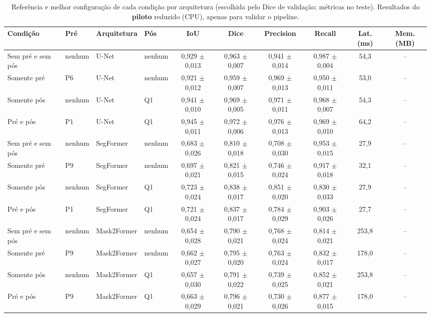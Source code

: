 \begin{table}[t]\centering\scriptsize\setlength{\tabcolsep}{2.5pt}
\caption{Referência e melhor configuração de cada condição por arquitetura (escolhida pelo Dice de validação; métricas no teste). Resultados do \textbf{piloto} reduzido (CPU), apenas para validar o pipeline.}\label{tab:resumo}
\begin{tabular}{llllcccccc}
\toprule
Condição & Pré & Arquitetura & Pós & IoU & Dice & Precision & Recall & Lat. (ms) & Mem. (MB) \\
\midrule
Sem pré e sem pós & nenhum & U-Net & nenhum & 0,929 $\pm$ 0,013 & 0,963 $\pm$ 0,007 & 0,941 $\pm$ 0,014 & 0,987 $\pm$ 0,004 & 54,3 & -- \\
Somente pré & P6 & U-Net & nenhum & 0,921 $\pm$ 0,012 & 0,959 $\pm$ 0,007 & 0,969 $\pm$ 0,013 & 0,950 $\pm$ 0,011 & 53,0 & -- \\
Somente pós & nenhum & U-Net & Q1 & 0,941 $\pm$ 0,010 & 0,969 $\pm$ 0,005 & 0,971 $\pm$ 0,011 & 0,968 $\pm$ 0,007 & 54,3 & -- \\
Pré e pós & P1 & U-Net & Q1 & 0,945 $\pm$ 0,011 & 0,972 $\pm$ 0,006 & 0,976 $\pm$ 0,013 & 0,969 $\pm$ 0,010 & 64,2 & -- \\
\midrule
Sem pré e sem pós & nenhum & SegFormer & nenhum & 0,683 $\pm$ 0,026 & 0,810 $\pm$ 0,018 & 0,708 $\pm$ 0,030 & 0,953 $\pm$ 0,015 & 27,9 & -- \\
Somente pré & P9 & SegFormer & nenhum & 0,697 $\pm$ 0,021 & 0,821 $\pm$ 0,015 & 0,746 $\pm$ 0,024 & 0,917 $\pm$ 0,018 & 32,1 & -- \\
Somente pós & nenhum & SegFormer & Q1 & 0,723 $\pm$ 0,024 & 0,838 $\pm$ 0,017 & 0,851 $\pm$ 0,020 & 0,830 $\pm$ 0,033 & 27,9 & -- \\
Pré e pós & P1 & SegFormer & Q1 & 0,721 $\pm$ 0,024 & 0,837 $\pm$ 0,017 & 0,784 $\pm$ 0,029 & 0,903 $\pm$ 0,026 & 27,7 & -- \\
\midrule
Sem pré e sem pós & nenhum & Mask2Former & nenhum & 0,654 $\pm$ 0,028 & 0,790 $\pm$ 0,021 & 0,768 $\pm$ 0,024 & 0,814 $\pm$ 0,021 & 253,8 & -- \\
Somente pré & P9 & Mask2Former & nenhum & 0,662 $\pm$ 0,027 & 0,795 $\pm$ 0,020 & 0,763 $\pm$ 0,024 & 0,832 $\pm$ 0,017 & 178,0 & -- \\
Somente pós & nenhum & Mask2Former & Q1 & 0,657 $\pm$ 0,030 & 0,791 $\pm$ 0,022 & 0,739 $\pm$ 0,025 & 0,852 $\pm$ 0,021 & 253,8 & -- \\
Pré e pós & P9 & Mask2Former & Q1 & 0,663 $\pm$ 0,029 & 0,796 $\pm$ 0,021 & 0,730 $\pm$ 0,026 & 0,877 $\pm$ 0,015 & 178,0 & -- \\
\bottomrule
\end{tabular}
\end{table}
